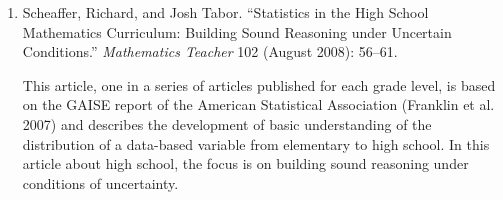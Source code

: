 {{\begin{enumerate}
          \par\noindent\hspace*{1em} This article, one in a series of articles published for each grade level, is based on the GAISE report of the American Statistical Association (Franklin et al. 2007) and describes the development of basic understanding of the distribution of a data-based variable from elementary to high school. In this article about middle school, the focus is on understanding center and spread. The authors discuss several different mathematical tasks used in classrooms, as well as students' responses.\vspace{.35\baselineskip}
        
        \item Scheaffer, Richard, and Josh Tabor. ``Statistics in the High School Mathematics Curriculum: Building Sound Reasoning under Uncertain Conditions.'' \emph{Mathematics Teacher} 102 (August 2008): 56--61.\vspace{.25\baselineskip}

          \par\noindent\hspace*{1em} This article, one in a series of articles published for each grade level, is based on the GAISE report of the American Statistical Association (Franklin et al. 2007) and describes the development of basic understanding of the distribution of a data-based variable from elementary to high school. In this article about high school, the focus is on building sound reasoning under conditions of uncertainty.
      \end{enumerate}}
  }
